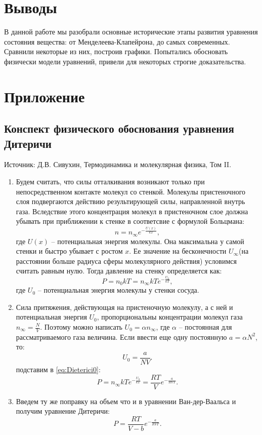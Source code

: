 \documentclass[a4paper]{article}
\numberwithin{equation}{subsection} %
\begin{document}
\section{Выводы}
В данной работе мы разобрали основные исторические этапы развития уравнения состояния вещества: от Менделеева-Клапейрона, до самых современных. Сравнили некоторые из них, построив графики. Попытались обосновать физически модели уравнений, привели для некоторых строгие доказательства.

\clearpage
\section{Приложение}
\subsection{Конспект физического обоснования уравнения Дитеричи}
Источник: Д.В. Сивухин, Термодинамика и молекулярная физика, Том II.

\begin{enumerate}
\item Будем считать, что силы отталкивания возникают только при непосредственном контакте молекул со стенкой. Молекулы пристеночного слоя подвергаются действию результирующей силы, направленной внутрь газа. Вследствие этого концентрация молекул в пристеночном слое должна убывать при приближении к стенке в соответсвие с формулой Больцмана:
\begin{equation}
      n = n_{\infty}e^{-\frac{U(x)}{kT}}, \label{eq:Dieterici0}
\end{equation}
где $U(x)$ -- потенциальная энергия молекулы. Она максимальна у самой стенки и быстро убывает с ростом $x$. Ее значение на бесконечности $U_{\infty}$(на расстоянии больше радиуса сферы молекулярного действия) условимся считать равным нулю. Тогда давление на стенку определяется как:
\begin{equation}
      P = n_0kT = n_{\infty}kTe^{-\frac{U_0}{kT}}, \label{eq:myeq0}
\end{equation}
где $U_0$ -- потенциальная энергия молекулы у стенки сосуда.
\item Сила притяжения, действующая на пристеночную молекулу, а с ней и потенциальная энергия $U_0$, пропорциональны концентрации молекул газа $n_{\infty} = \frac{N}{V}$. Поэтому можно написать $U_0 = \alpha n_{\infty}$, где $\alpha$ -- постоянная для рассматриваемого газа величина. Если ввести еще одну постоянную $a = \alpha N^2$, то:
\begin{equation}
      U_0 = \frac{a}{NV}.
\end{equation}
подставим в \ref{eq:Dieterici0}:
\begin{equation}
      P = n_{\infty}kTe^{-\frac{U_0}{kT}} = \frac{RT}{V}e^{-\frac{a}{RVT}}.
\end{equation}
\item Введем ту же поправку на объем что и в уравнении Ван-дер-Ваальса и получим уравнение Дитеричи:
\begin{equation}
      P =  \frac{RT}{V-b}e^{-\frac{a}{RVT}}.
\end{equation}
\end{enumerate}
\end{document}
